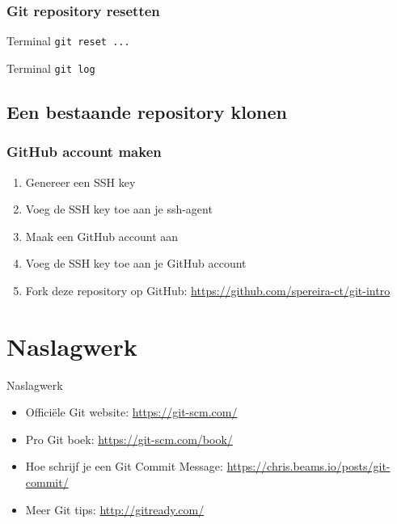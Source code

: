 \documentclass[]{beamer}
\begin{document}
\begin{frame}[fragile]
    \frametitle{Git repository resetten}

    \begin{block}{Terminal}
    \verb/git reset .../
    \end{block}

    \pause

    \begin{block}{Terminal}
    \verb/git log/
    \end{block}
\end{frame}

\subsection{Een bestaande repository klonen}

\begin{frame}
    \frametitle{GitHub account maken}

    \begin{enumerate}
        \item Genereer een SSH key
        \item Voeg de SSH key toe aan je ssh-agent
        \item Maak een GitHub account aan
        \item Voeg de SSH key toe aan je GitHub account
        \item Fork deze repository op GitHub: \url{https://github.com/spereira-ct/git-intro}
    \end{enumerate}
\end{frame}

\section*{Naslagwerk}

\begin{frame}{Naslagwerk}
    \begin{itemize}
    \item Officiële Git website: \url{https://git-scm.com/}
    \item Pro Git boek: \url{https://git-scm.com/book/}
    \item Hoe schrijf je een Git Commit Message: \url{https://chris.beams.io/posts/git-commit/}
    \item Meer Git tips: \url{http://gitready.com/}
    \end{itemize}
\end{frame}
\end{document}
